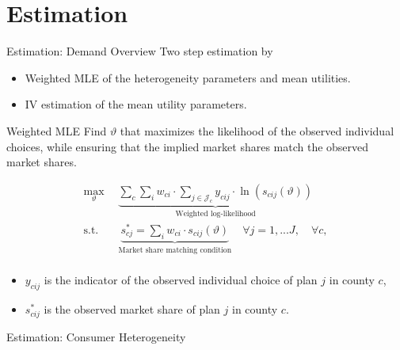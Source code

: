 \documentclass[professionalfonts, aspectratio=169]{beamer}
\begin{document}
\section{Estimation}

\begin{frame}{Estimation: Demand Overview}
  Two step estimation by \citet{goolsbeeConsumerGainsDirect2004}

  \begin{itemize}
    \item Weighted MLE of the heterogeneity parameters and mean utilities.
    \item IV estimation of the mean utility parameters.
  \end{itemize}
\end{frame}

\begin{frame}{Weighted MLE}
  Find $\vartheta$ that maximizes the likelihood of the observed individual choices, while ensuring that the implied market shares match the observed market shares.

  \begin{equation}
    \begin{aligned}
        \max_\vartheta
                            & \underbrace{\sum_{c} \sum_i w_{ci} \cdot \sum_{j\in \mathcal{J}_c}
            y_{cij} \cdot \ln(s_{cij} (\vartheta ))}
        _{\text{Weighted log-likelihood}}                                                        \\
        \textrm{s.t.} \quad & \underbrace{{s_{cj}^*} =
            \sum_i w_{ci} \cdot s_{cij} (\vartheta )}_{\text{Market share matching condition}}
        \quad \forall j = 1, ...J, \quad \forall c,                                              \\
    \end{aligned}
\end{equation}
\begin{itemize}\small
  \item $y_{cij}$ is the indicator of the observed individual choice of plan $j$ in county $c$,
  \item $s_{cij}^*$ is the observed market share of plan $j$ in county $c$.
\end{itemize}
  
\end{frame}

\begin{frame}{Estimation: Consumer Heterogeneity}
  
\end{frame}
\end{document}
